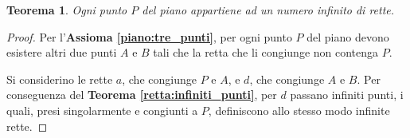 \documentclass{article}
\newtheorem{theorem}{Teorema}[section]
\theoremstyle{definition}
\begin{document}
\begin{theorem}
    Ogni punto $P$ del piano appartiene ad un numero infinito di rette.
\end{theorem}

\begin{proof}
    Per l'\textbf{Assioma \ref{piano:tre_punti}}, per ogni
    punto $P$ del piano devono esistere altri due punti $A$ e $B$
    tali che la retta che li congiunge non contenga $P$.

    Si considerino le rette $a$, che congiunge $P$ e $A$, e $d$,
    che congiunge $A$ e $B$. Per conseguenza del
    \textbf{Teorema \ref{retta:infiniti_punti}},
    per $d$ passano infiniti punti, i quali, presi singolarmente
    e congiunti a $P$, definiscono allo stesso modo infinite
    rette.
\end{proof}
\end{document}
